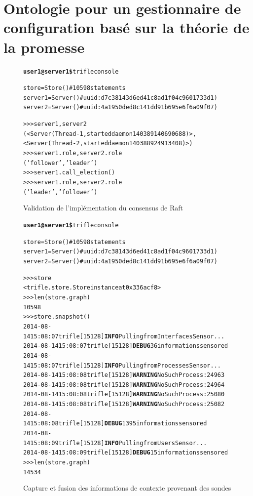 \section{Ontologie pour un gestionnaire de configuration basé sur la théorie de
la promesse}

\begin{figure}[H]
  \begin{alltt}
    \textbf{user1@server1\$} trifle console

    store   = Store()  # 10598 statements
    server1 = Server() # uuid: d7c38143d6ed41c8ad1f04c9601733d1)
    server2 = Server() # uuid: 4a1950ded8c141dd91b695e6f6a09f07)
    
    >>> server1, server2
    (<Server(Thread-1, started daemon 140389140690688)>, 
     <Server(Thread-2, started daemon 140388924913408)>)
    >>> server1.role, server2.role
    ('follower', 'leader')
    >>> server1.call_election()
    >>> server1.role, server2.role
    ('leader', 'follower')
  \end{alltt}
  \caption{Validation de l'implémentation du consensus de Raft}
  \label{fig:sourcecode}
\end{figure}

\begin{figure}[H]
  \begin{alltt}
    \textbf{user1@server1\$} trifle console

    store   = Store()  # 10598 statements
    server1 = Server() # uuid: d7c38143d6ed41c8ad1f04c9601733d1)
    server2 = Server() # uuid: 4a1950ded8c141dd91b695e6f6a09f07)
    
    >>> store
    <trifle.store.Store instance at 0x336acf8>
    >>> len(store.graph)
    10598
    >>> store.snapshot()
    2014-08-14 15:08:07 trifle[15128] \textbf{INFO} Pulling from InterfacesSensor...
    2014-08-14 15:08:07 trifle[15128] \textbf{DEBUG} 36 informations sensored
    2014-08-14 15:08:07 trifle[15128] \textbf{INFO} Pulling from ProcessesSensor...
    2014-08-14 15:08:08 trifle[15128] \textbf{WARNING} NoSuchProcess: 24963
    2014-08-14 15:08:08 trifle[15128] \textbf{WARNING} NoSuchProcess: 24964
    2014-08-14 15:08:08 trifle[15128] \textbf{WARNING} NoSuchProcess: 25080
    2014-08-14 15:08:08 trifle[15128] \textbf{WARNING} NoSuchProcess: 25082
    2014-08-14 15:08:08 trifle[15128] \textbf{DEBUG} 1395 informations sensored
    2014-08-14 15:08:09 trifle[15128] \textbf{INFO} Pulling from UsersSensor...
    2014-08-14 15:08:09 trifle[15128] \textbf{DEBUG} 15 informations sensored
    >>> len(store.graph)
    14534
  \end{alltt}
  \caption{Capture et fusion des informations de contexte provenant des sondes}
  \label{fig:sourcecode}
\end{figure}


